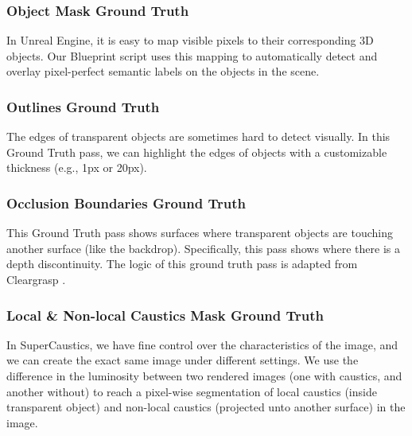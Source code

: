 \documentclass[conference]{IEEEtran}
\begin{document}
\begin{table*}[!h]
\centering
\caption{Models trained with SuperCaustics Data generalize well to novel scenarios}
\label{tab:cross}
\end{table*}


\subsubsection{\textbf{Object Mask Ground Truth}} In Unreal Engine, it is easy to map visible pixels to their corresponding 3D objects. Our Blueprint script uses this mapping to automatically detect and overlay pixel-perfect semantic labels on the objects in the scene.

\subsubsection{\textbf{Outlines Ground Truth}} The edges of transparent objects are sometimes hard to detect visually. In this Ground Truth pass, we can highlight the edges of objects with a customizable thickness (e.g., 1px or 20px).

\subsubsection{\textbf{Occlusion Boundaries Ground Truth}} This Ground Truth pass shows surfaces where transparent objects are touching another surface (like the backdrop). Specifically, this pass shows where there is a depth discontinuity. The logic of this ground truth pass is adapted from Cleargrasp \cite{cleargrasp}.

\subsubsection{\textbf {Local \& Non-local Caustics Mask Ground Truth}} In SuperCaustics, we have fine control over the characteristics of the image, and we  can create the exact same image under different settings. We use the difference in the  luminosity between two rendered images (one with caustics, and another without) to reach a pixel-wise segmentation of local caustics (inside transparent object) and non-local caustics (projected unto another surface) in the image. 
\end{document}
